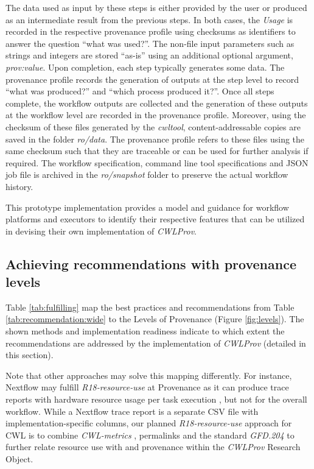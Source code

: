 \documentclass[a4paper,num-refs]{oup-contemporary}
\begin{document}
The data used as input by these steps is either provided by the user or produced as an intermediate result from the previous steps. In both cases, the \textit{Usage} is recorded in the respective provenance profile using checksums as identifiers to answer the question ``what was used?''. The non-file input parameters such as strings and integers are stored ``as-is'' using an additional optional argument, \textit{prov:value}. Upon completion, each step typically generates some data. The provenance profile records the generation of outputs at the step level to record ``what was produced?'' and ``which process produced it?''. Once all steps complete, the workflow outputs are collected and the generation of these outputs at the workflow level are recorded in the provenance profile. Moreover, using the checksum of these files generated by the \textit{cwltool}, content-addressable copies are saved in the folder \textit{ro/data}. The provenance profile refers to these files using the same checksum such that they are traceable or can be used for further analysis if required. The workflow specification, command line tool specifications and JSON job file is archived in the \textit{ro/snapshot} folder to preserve the actual workflow history.

This prototype implementation provides a model and guidance for workflow platforms and executors to identify their respective features that can be utilized in devising their own implementation of \textit{CWLProv}. 

\subsection{Achieving recommendations with provenance levels}
Table \ref{tab:fulfilling} map the best practices and recommendations from Table \ref{tab:recommendation:wide} to the Levels of Provenance (Figure \ref{fig:levels}). The shown methods and implementation readiness indicate to which extent the recommendations are addressed by the implementation of \textit{CWLProv} (detailed in this section). 

Note that other approaches may solve this mapping differently. For instance, Nextflow \citep{ditommaso_2017} may fulfill \textit{R18-resource-use} at Provenance  as it can produce trace reports with hardware resource usage per task execution \citep{nextflow_tracing}, but not for the overall workflow. While a Nextflow trace report is a separate CSV file with implementation-specific columns, our planned \textit{R18-resource-use} approach for CWL is to combine \textit{CWL-metrics} \citep{tazro2018}, permalinks and the standard \textit{GFD.204} \citep{cristofori2013usage} to further relate resource use with  and  provenance within the \textit{CWLProv} Research Object.
\end{document}
